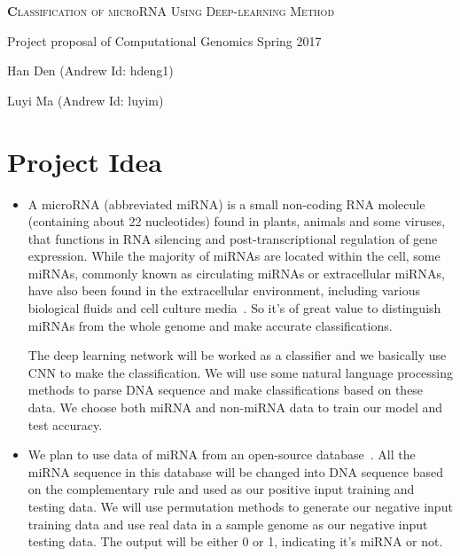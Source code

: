 \documentclass[letterpaper, 11pt]{article}
\begin{document}
\begin{center}
{\Large
	\textsc{\textbf Classification of microRNA Using Deep-learning Method}
}

\vspace{0.3cm}

\normalsize Project proposal of Computational Genomics Spring 2017

\vspace{0.5cm}

{\small
	Han Den (Andrew Id: hdeng1)
	
	Luyi Ma (Andrew Id: luyim)
}
\end{center}

\section{Project Idea}

\begin{itemize}
\item
A microRNA (abbreviated miRNA) is a small non-coding RNA molecule (containing about 22 nucleotides) found in plants, animals and some viruses, that functions in RNA silencing and post-transcriptional regulation of gene expression. While the majority of miRNAs are located within the cell, some miRNAs, commonly known as circulating miRNAs or extracellular miRNAs, have also been found in the extracellular environment, including various biological fluids and cell culture media~\cite{Wiki}.
So it's of great value to distinguish miRNAs from the whole genome and make accurate classifications.


The deep learning network will be worked as a classifier and we basically use CNN to make the classification. We will use some natural language processing methods to parse DNA sequence and make classifications based on these data. We choose both miRNA and non-miRNA data to train our model and test accuracy. 

\item 
We plan to use data of miRNA from an open-source database~\cite{miData}.
All the miRNA sequence in this database will be changed into DNA sequence based on the complementary rule and used as our positive input training and testing data. We will use permutation methods to generate our negative input training data and use real data in a sample genome as our negative input testing data. The output will be either 0 or 1, indicating it's miRNA or not.
\end{itemize}
\end{document}
